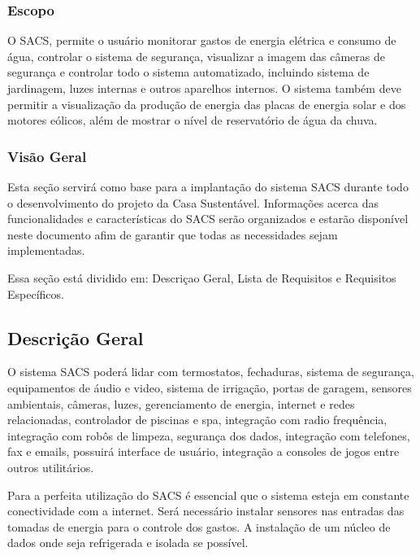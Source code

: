 \subsubsection{Escopo}

	O SACS, permite o usuário monitorar gastos de energia elétrica e consumo de água, controlar o sistema de segurança,
	visualizar a imagem das câmeras de segurança e controlar todo o sistema automatizado, incluindo sistema de
	jardinagem, luzes internas e outros aparelhos internos. O sistema também deve permitir a visualização da produção
	 de energia das placas de energia solar e dos motores eólicos, além de mostrar o nível de reservatório de água da
	  chuva.

\subsubsection{Visão Geral}

	Esta seção servirá como base para a implantação do sistema SACS durante todo o desenvolvimento do projeto da Casa
	 Sustentável. Informações acerca das funcionalidades e características do SACS serão organizados e estarão
	 disponível neste documento afim de garantir que todas as necessidades sejam implementadas.

	Essa seção está dividido em: Descriçao Geral, Lista de Requisitos e Requisitos Específicos.

\subsection{Descrição Geral}

	O sistema SACS poderá lidar com termostatos, fechaduras, sistema de segurança, equipamentos de áudio e video, sistema
	de irrigação, portas de garagem, sensores ambientais, câmeras, luzes, gerenciamento de energia, internet e
	redes relacionadas, controlador de piscinas e spa, integração com radio frequência, integração com robôs de
	limpeza, segurança dos dados, integração com telefones, fax e emails, possuirá interface de usuário, integração
	 a consoles de jogos entre outros utilitários.

	Para a perfeita utilização do SACS é essencial que o sistema esteja em constante conectividade com a internet.
	Será necessário instalar sensores nas entradas das tomadas de energia para o controle dos gastos. A instalação
	de um núcleo de dados onde seja refrigerada e isolada se possível.

